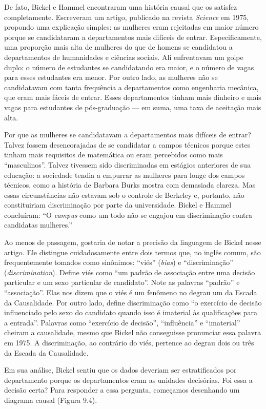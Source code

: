 \documentclass[11pt,a5paper,twoside]{book}
\begin{document}
De fato, Bickel e Hammel encontraram uma história causal que os satisfez completamente. Escreveram um artigo, publicado na revista \textit{Science} em 1975, propondo uma explicação simples: as mulheres eram rejeitadas em maior número porque se candidataram a departamentos mais difíceis de entrar. Especificamente, uma proporção mais alta de mulheres do que de homens se candidatou a departamentos de humanidades e ciências sociais. Ali enfrentavam um golpe duplo: o número de estudantes se candidatando era maior, e o número de vagas para esses estudantes era menor. Por outro lado, as mulheres não se candidatavam com tanta frequência a departamentos como engenharia mecânica, que eram mais fáceis de entrar. Esses departamentos tinham mais dinheiro e mais vagas para estudantes de pós-graduação — em suma, uma taxa de aceitação mais alta.

Por que as mulheres se candidatavam a departamentos mais difíceis de entrar? Talvez fossem desencorajadas de se candidatar a campos técnicos porque estes tinham mais requisitos de matemática ou eram percebidos como mais “masculinos”. Talvez tivessem sido discriminadas em estágios anteriores de sua educação: a sociedade tendia a empurrar as mulheres para longe dos campos técnicos, como a história de Barbara Burks mostra com demasiada clareza. Mas essas circunstâncias não estavam sob o controle de Berkeley e, portanto, não constituiriam discriminação por parte da universidade. Bickel e Hammel concluíram: “O \textit{campus} como um todo não se engajou em discriminação contra candidatas mulheres.”

Ao menos de passagem, gostaria de notar a precisão da linguagem de Bickel nesse artigo. Ele distingue cuidadosamente entre dois termos que, no inglês comum, são frequentemente tomados como sinônimos: “viés” (\textit{bias}) e “discriminação” (\textit{discrimination}). Define viés como “um padrão de associação entre uma decisão particular e um sexo particular de candidato”. Note as palavras “padrão” e “associação”. Elas nos dizem que o viés é um fenômeno no degrau um da Escada da Causalidade. Por outro lado, define discriminação como “o exercício de decisão influenciado pelo sexo do candidato quando isso é imaterial às qualificações para a entrada”. Palavras como “exercício de decisão”, “influência” e “imaterial” cheiram a causalidade, mesmo que Bickel não conseguisse pronunciar essa palavra em 1975. A discriminação, ao contrário do viés, pertence ao degrau dois ou três da Escada da Causalidade.

Em sua análise, Bickel sentiu que os dados deveriam ser estratificados por departamento porque os departamentos eram as unidades decisórias. Foi essa a decisão certa? Para responder a essa pergunta, começamos desenhando um diagrama causal (Figura 9.4).
\end{document}
